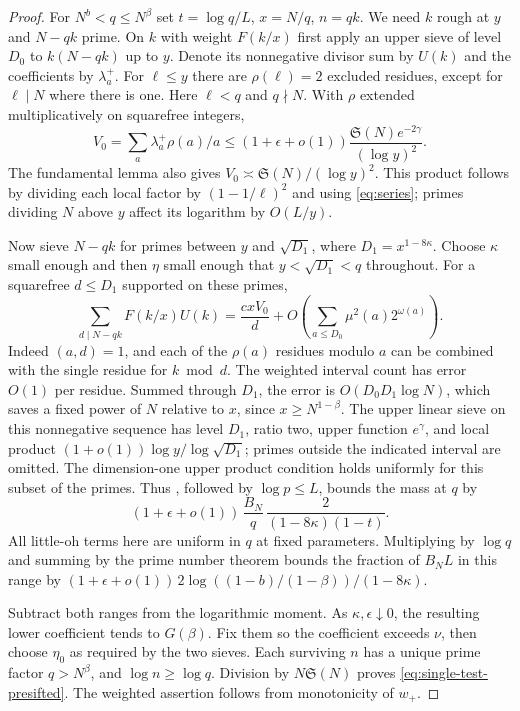 \documentclass[11pt,a4paper]{article}
\numberwithin{equation}{section}
\newcommand{\SSS}{\mathfrak S}
\begin{document}
\begin{proof}
For $N^b<q\le N^\beta$ set $t=\log q/L$, $x=N/q$, $n=qk$.
We need $k$ rough at $y$ and $N-qk$ prime. On $k$ with weight
$F(k/x)$ first apply an upper sieve of level $D_0$ to
$k(N-qk)$ up to $y$. Denote its nonnegative divisor sum by
$U(k)$ and the coefficients by $\lambda_a^+$. For $\ell\le y$
there are $\rho(\ell)=2$ excluded residues, except for
$\ell\mid N$ where there is one. Here $\ell<q$ and $q\nmid N$.
With $\rho$ extended multiplicatively on squarefree integers,
\[
 V_0=\sum_a\lambda_a^+\rho(a)/a
 \le (1+\epsilon+o(1))
       \frac{\SSS(N)e^{-2\gamma}}{(\log y)^2}.
\]
The fundamental lemma also gives $V_0\asymp\SSS(N)/(\log y)^2$.
This product follows by dividing each local factor by
$(1-1/\ell)^2$ and using \eqref{eq:series}; primes dividing $N$
above $y$ affect its logarithm by $O(L/y)$.

Now sieve $N-qk$ for primes between $y$ and $\sqrt{D_1}$,
where $D_1=x^{1-8\kappa}$. Choose $\kappa$ small enough and
then $\eta$ small enough that $y<\sqrt{D_1}<q$ throughout.
For a squarefree $d\le D_1$ supported on these primes,
\[
 \sum_{d\mid N-qk} F(k/x)U(k)
 =\frac{cx V_0}{d}+O\left(\sum_{a\le D_0}\mu^2(a)2^{\omega(a)}\right).
\]
Indeed $(a,d)=1$, and each of the $\rho(a)$ residues modulo $a$
can be combined with the single residue for $k\bmod d$.
The weighted interval count has error $O(1)$ per residue.
Summed through $D_1$, the error is $O(D_0D_1\log N)$, which
saves a fixed power of $N$ relative to $x$, since $x\ge N^{1-\beta}$.
The upper linear sieve on this nonnegative sequence has level
$D_1$, ratio two, upper function $e^\gamma$, and local product
$(1+o(1))\log y/\log\sqrt{D_1}$; primes outside the indicated
interval are omitted. The dimension-one upper product condition
holds uniformly for this subset of the primes. Thus
\cite[Lemma~2.5]{MatomakiZunigaSwitching}, followed by
$\log p\le L$, bounds the mass at $q$ by
\[
 (1+\epsilon+o(1))\,\frac{B_N}{q}\,
             \frac{2}{(1-8\kappa)(1-t)} .
\]
All little-oh terms here are uniform in $q$ at fixed parameters.
Multiplying by $\log q$ and summing by the prime number theorem
bounds the fraction of $B_NL$ in this range by
$(1+\epsilon+o(1))\,2\log((1-b)/(1-\beta))/(1-8\kappa)$.

Subtract both ranges from the logarithmic moment. As
$\kappa,\epsilon\downarrow0$, the resulting lower coefficient
tends to $G(\beta)$. Fix them so the coefficient exceeds $\nu$,
then choose $\eta_0$ as required by the two sieves.
Each surviving $n$ has a unique prime factor $q>N^\beta$,
and $\log n\ge\log q$. Division by $N\SSS(N)$ proves
\eqref{eq:single-test-presifted}. The weighted assertion follows
from monotonicity of $w_+$.


\end{proof}
\end{document}
